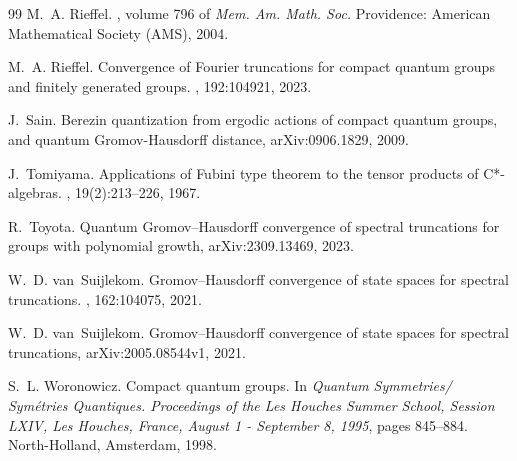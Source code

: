 \documentclass{amsart}
\theoremstyle{plain}
\theoremstyle{definition}
\theoremstyle{remark}
\begin{document}
\begin{thebibliography}{99}
		M.~A. Rieffel.
		, volume 796 of {\em Mem. {{Am}}. {{Math}}. {{Soc}}.}
		\newblock Providence: American Mathematical Society (AMS), 2004.
		
		M.~A. Rieffel.
		\newblock Convergence of {{Fourier}} truncations for compact quantum groups and
		finitely generated groups.
		, 192:104921, 2023.
		
		J.~Sain.
		\newblock Berezin quantization from ergodic actions of compact quantum groups, and quantum Gromov-Hausdorff distance, arXiv:0906.1829, 2009.
		
		J.~Tomiyama.
		\newblock Applications of {{Fubini}} type theorem to the tensor products of
		{{C}}*-algebras.
		, 19(2):213--226, 1967.
		
		R.~Toyota.
		\newblock Quantum {{Gromov--Hausdorff}} convergence of spectral truncations for
		groups with polynomial growth, arXiv:2309.13469, 2023.
		
		W.~D. van~Suijlekom.
		\newblock Gromov--Hausdorff convergence of state spaces for spectral
		truncations.
		, 162:104075, 2021.
		
		W.~D. van~Suijlekom.
		\newblock Gromov--Hausdorff convergence of state spaces for spectral
		truncations, arXiv:2005.08544v1, 2021.
		
		S.~L. Woronowicz.
		\newblock Compact quantum groups.
		\newblock In {\em Quantum Symmetries/ {{Sym{\'e}tries}} Quantiques.
			{{Proceedings}} of the {{Les Houches}} Summer School, {{Session LXIV}}, {{Les Houches}}, {{France}}, {{August}} 1 - {{September}} 8, 1995}, pages 845--884.
		North-Holland, Amsterdam, 1998.
		
	\end{thebibliography}
	
\end{document}
